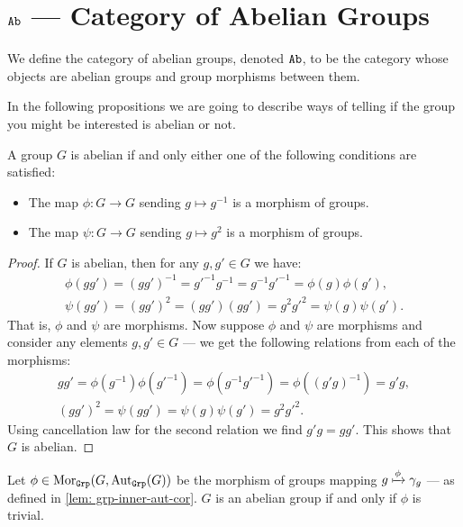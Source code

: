 \section{\texorpdfstring{\({\texttt{Ab}}\)}{Ab} --- Category of Abelian Groups}

\begin{definition}
We define the category of abelian groups, denoted \({\texttt{Ab}}\), to be the category
whose objects are abelian groups and group morphisms between them.
\end{definition}

In the following propositions we are going to describe ways of telling if the
group you might be interested is abelian or not.

\begin{proposition}
A group \(G\) is abelian if and only either one of the following conditions
are satisfied:
\begin{itemize}
  \setlength\itemsep{0em}
  \item The map \(\phi: G \to G\) sending \(g \mapsto g^{-1}\) is a morphism of
    groups.
  \item The map \(\psi: G \to G\) sending \(g \mapsto g^2\) is a morphism of
    groups.
\end{itemize}
\end{proposition}

\begin{proof}
If \(G\) is abelian, then for any \(g, g' \in G\) we have:
\begin{gather*}
  \phi(gg') = (gg')^{-1} = g'^{-1} g^{-1} = g^{-1}g'^{-1} = \phi(g) \phi(g'),
  \\
  \psi(gg') = (gg')^2 = (gg')(gg') = g^2g'^2 = \psi(g)\psi(g').
\end{gather*}
That is, \(\phi\) and \(\psi\) are morphisms. Now suppose \(\phi\) and
\(\psi\) are morphisms and consider any elements \(g, g' \in G\) --- we get
the following relations from each of the morphisms:
\begin{gather*}
  gg' = \phi(g^{-1})\phi(g'^{-1}) = \phi(g^{-1}g'^{-1})
  = \phi((g'g)^{-1}) = g'g,
  \\
  (gg')^2 = \psi(gg') = \psi(g) \psi(g') = g^2 g'^2.
\end{gather*}
Using cancellation law for the second relation we find \(g'g = gg'\). This
shows that \(G\) is abelian.
\end{proof}

\begin{proposition}
Let \(\phi \in \operatorname{Mor}_{\texttt{Grp}}(G, \operatorname{Aut}_{\texttt{Grp}}(G))\) be the morphism of groups mapping
\(g \xmapsto \phi \gamma_g\) --- as defined in \cref{lem: grp-inner-aut-cor}.
\(G\) is an abelian group if and only if \(\phi\) is trivial.
\end{proposition}

